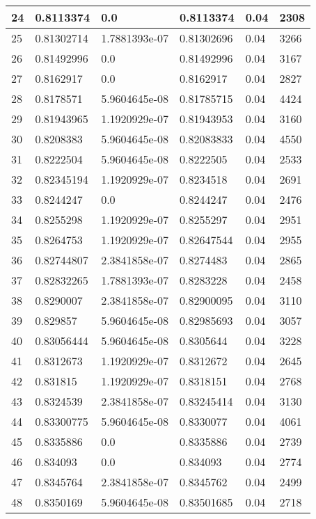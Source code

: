 \begin{longtable}{|l|l|l|l|l|l|}
24 & 0.8113374 & 0.0 & 0.8113374 & 0.04 & 2308 \\ \hline 
25 & 0.81302714 & 1.7881393e-07 & 0.81302696 & 0.04 & 3266 \\ \hline 
26 & 0.81492996 & 0.0 & 0.81492996 & 0.04 & 3167 \\ \hline 
27 & 0.8162917 & 0.0 & 0.8162917 & 0.04 & 2827 \\ \hline 
28 & 0.8178571 & 5.9604645e-08 & 0.81785715 & 0.04 & 4424 \\ \hline 
29 & 0.81943965 & 1.1920929e-07 & 0.81943953 & 0.04 & 3160 \\ \hline 
30 & 0.8208383 & 5.9604645e-08 & 0.82083833 & 0.04 & 4550 \\ \hline 
31 & 0.8222504 & 5.9604645e-08 & 0.8222505 & 0.04 & 2533 \\ \hline 
32 & 0.82345194 & 1.1920929e-07 & 0.8234518 & 0.04 & 2691 \\ \hline 
33 & 0.8244247 & 0.0 & 0.8244247 & 0.04 & 2476 \\ \hline 
34 & 0.8255298 & 1.1920929e-07 & 0.8255297 & 0.04 & 2951 \\ \hline 
35 & 0.8264753 & 1.1920929e-07 & 0.82647544 & 0.04 & 2955 \\ \hline 
36 & 0.82744807 & 2.3841858e-07 & 0.8274483 & 0.04 & 2865 \\ \hline 
37 & 0.82832265 & 1.7881393e-07 & 0.8283228 & 0.04 & 2458 \\ \hline 
38 & 0.8290007 & 2.3841858e-07 & 0.82900095 & 0.04 & 3110 \\ \hline 
39 & 0.829857 & 5.9604645e-08 & 0.82985693 & 0.04 & 3057 \\ \hline 
40 & 0.83056444 & 5.9604645e-08 & 0.8305644 & 0.04 & 3228 \\ \hline 
41 & 0.8312673 & 1.1920929e-07 & 0.8312672 & 0.04 & 2645 \\ \hline 
42 & 0.831815 & 1.1920929e-07 & 0.8318151 & 0.04 & 2768 \\ \hline 
43 & 0.8324539 & 2.3841858e-07 & 0.83245414 & 0.04 & 3130 \\ \hline 
44 & 0.83300775 & 5.9604645e-08 & 0.8330077 & 0.04 & 4061 \\ \hline 
45 & 0.8335886 & 0.0 & 0.8335886 & 0.04 & 2739 \\ \hline 
46 & 0.834093 & 0.0 & 0.834093 & 0.04 & 2774 \\ \hline 
47 & 0.8345764 & 2.3841858e-07 & 0.8345762 & 0.04 & 2499 \\ \hline 
48 & 0.8350169 & 5.9604645e-08 & 0.83501685 & 0.04 & 2718 \\ \hline 

\end{longtable}

